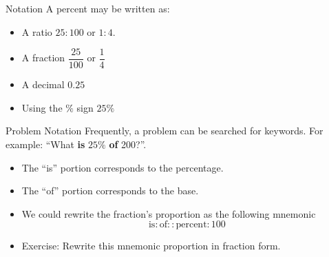 \documentclass[]{beamer}
\begin{document}
\begin{frame}{Notation}
A percent may be written as:
\begin{itemize}[<+(1)->]
  \item A ratio $25 : 100$ or $1:4$.
  \item A fraction $\dfrac{25}{100}$ or $\dfrac{1}{4}$
  \item A decimal $0.25$
  \item Using the $\%$ sign $25\%$
\end{itemize}
\end{frame}

\begin{frame}{Problem Notation}
Frequently, a problem can be searched for keywords.  For example: ``What {\bf is} $25\%$ {\bf of} 200?''.
\begin{itemize}[<+(1)->]
  \item The ``is'' portion corresponds to the percentage.
  \item The ``of'' portion corresponds to the base.
  \item We could rewrite the fraction's proportion as the following mnemonic
  \[
  \mathrm{is} : \mathrm{of} :: \mathrm{percent} : 100
  \]
  \item Exercise: Rewrite this mnemonic proportion in fraction form.
\end{itemize}
\end{frame}
\end{document}
